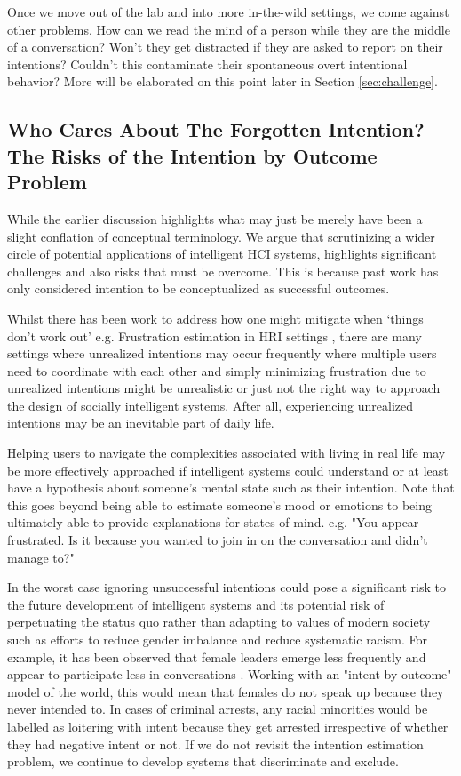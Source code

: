 \documentclass[manuscript,screen,review]{acmart}
\begin{document}
Once we move out of the lab and into more in-the-wild settings, we come against other problems. How can we read the mind of a person while they are the middle of a conversation? Won't they get distracted if they are asked to report on their intentions? Couldn't this contaminate their spontaneous overt intentional behavior? More will be elaborated on this point later in Section \ref{sec:challenge}.

\subsection{Who Cares About The Forgotten Intention? The Risks of the Intention by Outcome Problem}
While the earlier discussion highlights what may just be merely have been a slight conflation of conceptual terminology. We argue that scrutinizing a wider circle of potential applications of intelligent HCI systems, highlights significant challenges and also risks that must be overcome. This is because past work has only considered intention to be conceptualized as successful outcomes. 

Whilst there has been work to address how one might mitigate when `things don't work out' e.g. Frustration estimation in HRI settings \cite{10.3389/fpsyg.2021.640186}, there are many settings where unrealized intentions may occur frequently where multiple users need to coordinate with each other and simply minimizing frustration due to unrealized intentions might be unrealistic or just not the right way to approach the design of socially intelligent systems. After all, experiencing unrealized intentions may be an inevitable part of daily life. 

Helping users to navigate the complexities associated with living in real life may be more effectively approached if intelligent systems could understand or at least have a hypothesis about someone's mental state such as their intention. Note that this goes beyond being able to estimate someone's mood or emotions to being ultimately able to provide explanations for states of mind. e.g. "You appear frustrated. Is it because you wanted to join in on the conversation and didn't manage to?"

In the worst case ignoring unsuccessful intentions could pose a significant risk to the future development of intelligent systems and its potential risk of perpetuating the status quo rather than adapting to values of modern society such as efforts to reduce gender imbalance and reduce systematic racism. For example, it has been observed that female leaders emerge less frequently and appear to participate less in conversations \cite{badura2018gender,GERPOTT2018523,36a5eb2317d14d3aab58408b897ff673}. Working with an "intent by outcome" model of the world, this would mean that females do not speak up because they never intended to. In cases of criminal arrests, any racial minorities would be labelled as loitering with intent because they get arrested irrespective of whether they had negative intent or not. If we do not revisit the intention estimation problem, we continue to develop systems that discriminate and exclude.
\end{document}
